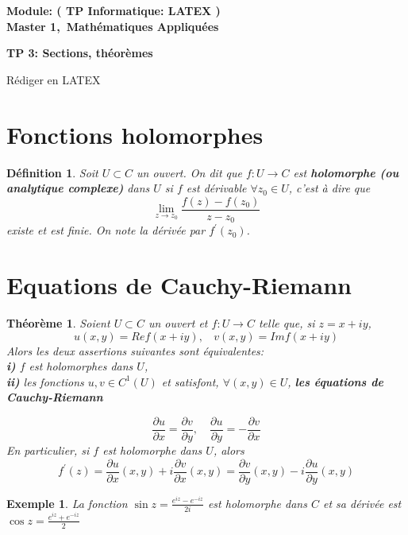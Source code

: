 \documentclass[a4paper]{article}
\newtheorem{montheorem}{Th\'eor\` eme}[section]
\newtheorem{madef}{D\'efinition}[section]
\newtheorem{monexemple}{Exemple}[section]
\def\dfrac{\displaystyle\frac}
\begin{document}
\noindent
\bf  {Module: ( TP Informatique: LATEX  )\qquad{}}\\
\bf {Master 1,\ Math\'ematiques Appliqu\'ees}\\
\begin{center}
\bf {TP 3: Sections, th\'eor\`emes}
\end{center}
R\'ediger en \large {LATEX}\\
\noindent
\section{Fonctions holomorphes }
 \begin{madef}
 Soit $ U \subset C$
 un ouvert.
 On dit que $f:U \rightarrow C$ est
 \textbf{holomorphe (ou analytique complexe)} dans $U$ si $f$ est d\'erivable $\forall z_0 \in U$, c'est \`a dire que
 $$
 \lim_{z\rightarrow z_0}\frac{f(z)-f(z_0)}{z-z_0}
 $$
 existe et est finie. On note la d\'eriv\'ee par $f^\prime(z_0)$.
 \end{madef}

 \section{Equations de Cauchy-Riemann}
 \begin{montheorem}
 Soient $U \subset C$ un ouvert et $f:U \rightarrow C$ telle que, si $z=x+iy$,
 $$
 u(x,y)=Re f(x+iy), \ \ \ \ v(x,y)=Im f(x+iy)
 $$
 Alors les deux assertions suivantes sont \'equivalentes:\\
 \textbf{i)} $f$ est holomorphes dans $U$,\\
 \textbf{ii)} les fonctions $u,v \in C^1(U)$ et satisfont, $ \forall (x,y)\in U$, \textbf{les \'equations de Cauchy-Riemann}

 $$
 \frac{\partial u}{\partial x}=\frac{\partial v}{\partial y}, \quad \frac{\partial u}{\partial y}=-\frac{\partial v}{\partial x}
 $$
En particulier, si $f$ est holomorphe dans $U$, alors
$$
f^\prime(z)=\frac{\partial u}{\partial x}(x,y)+i\frac{\partial v}{\partial x}(x,y)=\frac{\partial v}{\partial y}(x,y)-i\frac{\partial u}{\partial y}(x,y)
$$
\end{montheorem}
\begin{monexemple}
La fonction $\sin z=\dfrac{e^{iz}-e^{-iz}}{2i}$ est holomorphe dans $C$ et sa d\'eriv\'ee est $\cos z=\dfrac{e^{iz}+e^{-iz}}{2}$
\end{monexemple}
\end{document}
